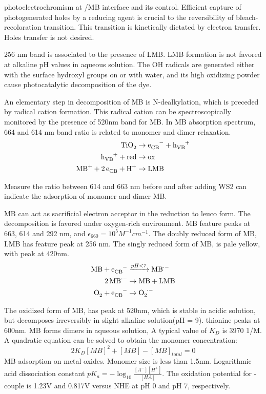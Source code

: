 \documentclass[11pt]{article} %
\begin{document}
\cite{DeTacconi1997} photoelectrochromism at /MB interface and its control. Efficient capture of photogenerated holes by a reducing agent is crucial to the reversibility of bleach-recoloration transition. This transition is kinetically dictated by electron transfer. Holes transfer is not desired.

256 nm band is associated to the presence of LMB. LMB formation is not favored at alkaline pH values in aqueous solution. The OH radicals are generated either with the surface hydroxyl groups on  or with water, and its high oxidizing powder cause photocatalytic decomposition of the dye.

An elementary step in decomposition of MB is N-dealkylation, which is preceded by radical cation formation.\cite{Takizawa1978} This radical cation can be spectroscopically monitored by the presence of 520nm band for MB. In MB absorption spectrum, 664 and 614 nm band ratio is related to monomer and dimer relaxation.
\begin{align}
\cee{TiO2 &\rightarrow e_{CB}^- + h_{VB}^+ \\
h_{VB}^+ + red &\rightarrow ox\\
MB^+ + 2e_{CB}^ + H^+ &\rightarrow LMB}
\end{align}

Measure the ratio between 614 and 663 nm before and after adding WS2 can indicate the adsorption of monomer and dimer MB.


\cite{Mills1999} MB can act as sacrificial electron acceptor in the reduction to leuco form. The decomposition is favored under oxygen-rich environment. MB feature peaks at 663, 614 and 292 nm, and $\epsilon_{660}=10^5 M^{-1}cm^{-1}$. The doubly reduced form of MB, LMB has feature peak at 256 nm. The singly reduced form of MB,  is pale yellow, with peak at 420nm.
\begin{align}
\cee{MB + e_{CB}^- &->[pH<7] MB^{.-} \\
2MB^{.-} &\rightarrow MB + LMB\\
O2 + e_{CB}^- &\rightarrow O2^{.-}}
\end{align}

The oxidized form of MB,  has peak at 520nm, which is stable in acidic solution, but decomposes irreversibly in slight alkaline solution(pH = 9).
thionine peaks at 600nm.
MB forms dimers in aqueous solution,
A typical value of $K_D$ is 3970 1/M. A quadratic equation can be solved to obtain the monomer concentration:
\[
2K_D [MB]^2 + [MB] - [MB]_{total} = 0
\]
MB adsorption on metal oxides. Monomer size is less than 1.5nm.
Logarithmic acid dissociation constant $pK_a= -\log_10 \frac{[A^-][H^+]}{[HA]}$. The oxidation potential for - couple is 1.23V and 0.817V versus NHE at pH 0 and pH 7, respectively.
\end{document}
